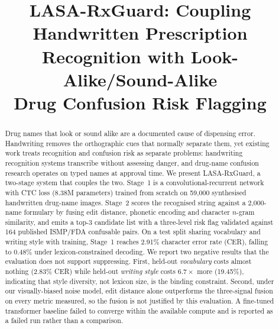 \documentclass[conference]{IEEEtran}
\begin{document}
\title{LASA-RxGuard: Coupling Handwritten Prescription\\Recognition with Look-Alike/Sound-Alike\\Drug Confusion Risk Flagging}

\author{
}

\maketitle

\begin{abstract}
Drug names that look or sound alike are a documented cause of dispensing error.
Handwriting removes the orthographic cues that normally separate them, yet
existing work treats recognition and confusion risk as separate problems:
handwriting recognition systems transcribe without assessing danger, and
drug-name confusion research operates on typed names at approval time. We
present LASA-RxGuard, a two-stage system that couples the two. Stage~1 is a
convolutional-recurrent network with CTC loss (8.38M parameters) trained from
scratch on 59{,}000 synthesised handwritten drug-name images. Stage~2 scores the
recognised string against a 2{,}000-name formulary by fusing edit distance,
phonetic encoding and character $n$-gram similarity, and emits a top-3 candidate
list with a three-level risk flag validated against 164 published ISMP/FDA
confusable pairs. On a test split sharing vocabulary and writing style with
training, Stage~1 reaches 2.91\% character error rate (CER), falling to 0.48\%
under lexicon-constrained decoding. We report two negative results that the
evaluation does not support suppressing. First, held-out \emph{vocabulary} costs
almost nothing (2.83\% CER) while held-out \emph{writing style} costs
$6.7\times$ more (19.45\%), indicating that style diversity, not lexicon size,
is the binding constraint. Second, under our visually-biased noise model,
edit distance alone outperforms the three-signal fusion on every metric
measured, so the fusion is not justified by this evaluation. A fine-tuned
transformer baseline failed to converge within the available compute and is
reported as a failed run rather than a comparison.
\end{abstract}
\end{document}
